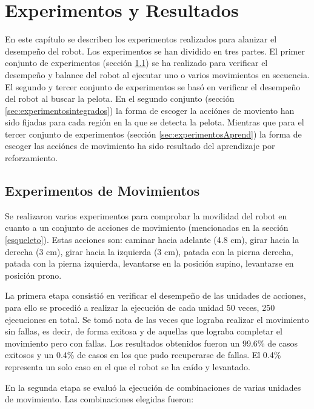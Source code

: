 \chapter{Experimentos y Resultados}\label{chapter:resultados}
En este capítulo se describen los experimentos realizados para alanizar el desempeño del robot. Los experimentos se han dividido en tres partes. El primer conjunto de experimentos (sección \ref{sec:experimentosMov}) se ha realizado para verificar el desempeño y balance del robot al ejecutar uno o varios movimientos en secuencia. El segundo y tercer conjunto de experimentos se bas\'o en verificar el desempeño del robot al buscar la pelota. En el segundo conjunto (sección \ref{sec:experimentosintegrados}) la forma de escoger la acciónes de moviento han sido fijadas para cada región en la que se detecta la pelota. Mientras que para el tercer conjunto de experimentos (secci\'on \ref{sec:experimentosAprend}) la forma de escoger las acci\'ones de movimiento ha sido resultado del aprendizaje por reforzamiento. 
 
\section{Experimentos de Movimientos}\label{sec:experimentosMov}

Se realizaron varios experimentos para comprobar la movilidad del robot en cuanto a un conjunto de acciones de movimiento (mencionadas en la sección \ref{esqueleto}). Estas acciones son: caminar hacia adelante (4.8 cm), girar hacia la derecha (3 cm), girar hacia la izquierda (3 cm), patada con la pierna derecha, patada con la pierna izquierda, levantarse en la posición supino, levantarse en posición prono.

La primera etapa consistió en verificar el desempeño de las unidades de acciones, para ello se procedió a realizar la ejecución de cada unidad 50 veces, 250 ejecuciones en total. Se tomó nota de las veces que lograba realizar el movimiento sin fallas, es decir, de forma exitosa y de aquellas que lograba completar el movimiento pero con fallas. Los resultados obtenidos fueron un 99.6\% de casos exitosos y un 0.4\% de casos en los que pudo recuperarse de fallas. El 0.4\% representa un solo caso en el que el robot se ha caído y levantado.  

En la segunda etapa se evalu\'o la ejecuci\'on de combinaciones de varias unidades de movimiento. Las combinaciones elegidas fueron: 

